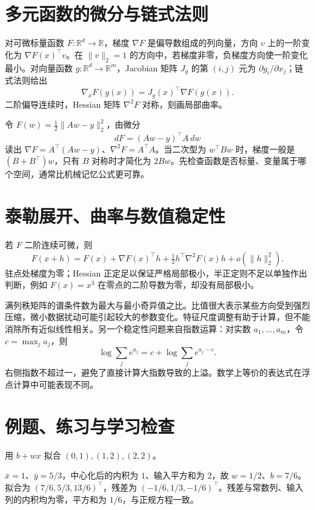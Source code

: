 \documentclass[UTF8,12pt,a4paper,fontset=fandol]{ctexbook}
\begin{document}
\section{多元函数的微分与链式法则}

对可微标量函数 $F:\mathbb R^d\to\mathbb R$，梯度 $\nabla F$ 是偏导数组成的列向量，方向 $v$ 上的一阶变化为 $\nabla F(x)^\top v$。在 $\|v\|_2=1$ 的方向中，若梯度非零，负梯度方向使一阶变化最小。对向量函数 $g:\mathbb R^d\to\mathbb R^m$，Jacobian 矩阵 $J_g$ 的第 $(i,j)$ 元为 $\partial g_i/\partial x_j$；链式法则给出
\[
 \nabla_x F(g(x))=J_g(x)^\top\nabla F(g(x)).
\]
二阶偏导连续时，Hessian 矩阵 $\nabla^2F$ 对称，刻画局部曲率。

令 $F(w)=\tfrac12\|Aw-y\|_2^2$，由微分
\[
 dF=(Aw-y)^\top A\,dw
\]
读出 $\nabla F=A^\top(Aw-y)$、$\nabla^2F=A^\top A$。当二次型为 $w^\top Bw$ 时，梯度一般是 $(B+B^\top)w$，只有 $B$ 对称时才简化为 $2Bw$。先检查函数是否标量、变量属于哪个空间，通常比机械记忆公式更可靠。

\section{泰勒展开、曲率与数值稳定性}

若 $F$ 二阶连续可微，则
\[
 F(x+h)=F(x)+\nabla F(x)^\top h+\tfrac12h^\top\nabla^2F(x)h+o(\|h\|_2^2).
\]
驻点处梯度为零；Hessian 正定足以保证严格局部极小，半正定则不足以单独作出判断，例如 $F(x)=x^3$ 在零点的二阶导数为零，却没有局部极小。

满列秩矩阵的谱条件数为最大与最小奇异值之比。比值很大表示某些方向受到强烈压缩，微小数据扰动可能引起较大的参数变化。特征尺度调整有助于计算，但不能消除所有近似线性相关。另一个稳定性问题来自指数运算：对实数 $a_1,\ldots,a_m$，令 $c=\max_j a_j$，则
\[
 \log\sum_j e^{a_j}=c+\log\sum_j e^{a_j-c}.
\]
右侧指数不超过一，避免了直接计算大指数导致的上溢。数学上等价的表达式在浮点计算中可能表现不同。

\section{例题、练习与学习检查}

\begin{example}[投影求一条直线]
用 $b+wx$ 拟合 $(0,1),(1,2),(2,2)$。
\end{example}
\begin{solve}
$\bar x=1$、$\bar y=5/3$，中心化后的内积为 $1$、输入平方和为 $2$，故 $w=1/2$、$b=7/6$。拟合为 $(7/6,5/3,13/6)^\top$，残差为 $(-1/6,1/3,-1/6)^\top$。残差与常数列、输入列的内积均为零，平方和为 $1/6$，与正规方程一致。
\end{solve}
\end{document}
